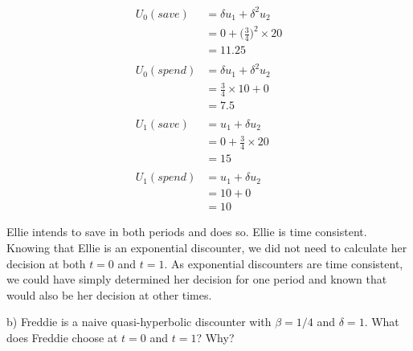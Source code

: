 \documentclass[
  letterpaper,
  DIV=11,
  numbers=noendperiod]{scrreprt}
\begin{document}
\begin{tcolorbox}[enhanced jigsaw, title=\textcolor{quarto-callout-tip-color}{\faLightbulb}\hspace{0.5em}{Answer}, toprule=.15mm, colback=white, breakable, titlerule=0mm, colframe=quarto-callout-tip-color-frame, coltitle=black, opacityback=0, rightrule=.15mm, colbacktitle=quarto-callout-tip-color!10!white, bottomtitle=1mm, opacitybacktitle=0.6, arc=.35mm, bottomrule=.15mm, toptitle=1mm, leftrule=.75mm, left=2mm]

\begin{align*}
U_0(save)&=\delta u_1+\delta^2 u_2 \\
&=0+\bigg(\frac{3}{4}\bigg)^2\times 20 \\
&=11.25 \\
\\
U_0(spend)&=\delta u_1+\delta^2 u_2 \\
&=\frac{3}{4}\times 10+0 \\
&=7.5 \\
\\
U_1(save)&=u_1+\delta u_2 \\
&=0+\frac{3}{4}\times 20 \\
&=15 \\
\\
U_1(spend)&=u_1+\delta u_2 \\
&=10+0\\
&=10
\end{align*}

Ellie intends to save in both periods and does so. Ellie is time
consistent. Knowing that Ellie is an exponential discounter, we did not
need to calculate her decision at both \(t=0\) and \(t=1\). As
exponential discounters are time consistent, we could have simply
determined her decision for one period and known that would also be her
decision at other times.

\end{tcolorbox}

b) Freddie is a naive quasi-hyperbolic discounter with \(\beta=1/4\) and
\(\delta=1\). What does Freddie choose at \(t=0\) and \(t=1\)? Why?
\end{document}
